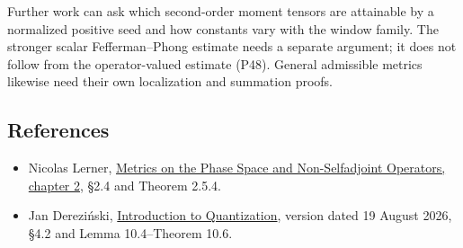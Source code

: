 \documentclass[
  11pt,
]{article}
\providecommand{\tightlist}{%
  \setlength{\itemsep}{0pt}\setlength{\parskip}{0pt}}
\begin{document}
Further work can ask which second-order moment tensors are attainable by
a normalized positive seed and how constants vary with the window
family. The stronger scalar Fefferman--Phong estimate needs a separate
argument; it does not follow from the operator-valued estimate (P48).
General admissible metrics likewise need their own localization and
summation proofs.

\subsection{References}\label{references}

\begin{itemize}
\tightlist
\item
  Nicolas Lerner,
  \href{https://webusers.imj-prg.fr/~nicolas.lerner/ch2booklerner.pdf}{Metrics
  on the Phase Space and Non-Selfadjoint Operators, chapter 2}, §2.4 and
  Theorem 2.5.4.
\item
  Jan Dereziński,
  \href{https://www.fuw.edu.pl/~derezins/quantize.pdf}{Introduction to
  Quantization}, version dated 19 August 2026, §4.2 and Lemma
  10.4--Theorem 10.6.
\end{itemize}
\end{document}
